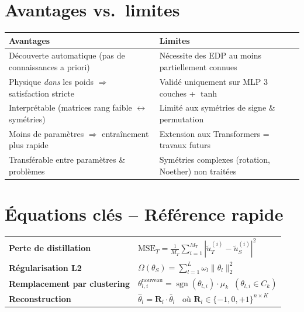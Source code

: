 \documentclass[11pt,a4paper]{article}
\newcommand{\R}{\mathbf{R}}
\begin{document}
\section{Avantages vs.\ limites}

\begin{center}
\renewcommand{\arraystretch}{1.3}
\begin{tabular}{@{}p{6.5cm} p{6.5cm}@{}}
\toprule
\textbf{Avantages} & \textbf{Limites} \\
\midrule
Découverte automatique (pas de connaissances a priori) & Nécessite des EDP au moins partiellement connues \\
Physique \textit{dans} les poids $\Rightarrow$ satisfaction stricte & Validé uniquement sur MLP 3 couches + $\tanh$ \\
Interprétable (matrices rang faible $\leftrightarrow$ symétries) & Limité aux symétries de signe \& permutation \\
Moins de paramètres $\Rightarrow$ entraînement plus rapide & Extension aux Transformers = travaux futurs \\
Transférable entre paramètres \& problèmes & Symétries complexes (rotation, Noether) non traitées \\
\bottomrule
\end{tabular}
\end{center}

\section{Équations clés -- Référence rapide}

\begin{tcolorbox}[colback=blue!3,colframe=blue!40!black]
\renewcommand{\arraystretch}{1.8}
\begin{tabular}{@{}l l@{}}
\textbf{Perte de distillation} & $\displaystyle\text{MSE}_T = \frac{1}{M_T}\sum_{i=1}^{M_T}|\tilde{u}_T^{(i)}-\tilde{u}_S^{(i)}|^2$ \\
\textbf{Régularisation L2} & $\displaystyle\Omega(\theta_S) = \sum_{l=1}^{L}\omega_l\|\theta_l\|_2^2$ \\
\textbf{Remplacement par clustering} & $\theta_{l,i}^{\text{nouveau}} = \operatorname{sgn}(\theta_{l,i})\cdot\mu_k \;\;(\theta_{l,i}\in C_k)$ \\
\textbf{Reconstruction} & $\hat{\theta}_l = \R_l\cdot\bar{\theta}_l \;\;$ où $\R_l\in\{-1,0,+1\}^{n\times K}$ \\
\end{tabular}
\end{tcolorbox}
\end{document}
